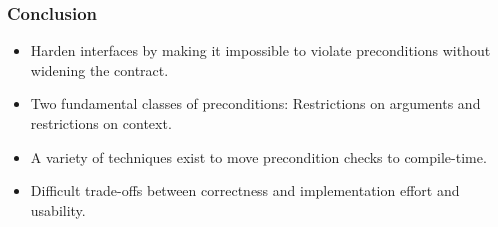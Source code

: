 \documentclass[aspectratio=169]{beamer}
\begin{document}
%

\begin{frame}
  \frametitle{Conclusion}
  
  \begin{itemize}
  \item Harden interfaces by making it impossible to violate preconditions without widening the contract.
  \item Two fundamental classes of preconditions: Restrictions on arguments and restrictions on context.
  \item A variety of techniques exist to move precondition checks to compile-time.
  \item Difficult trade-offs between correctness and implementation effort and usability.
  \end{itemize}
  
\end{frame}
\end{document}
